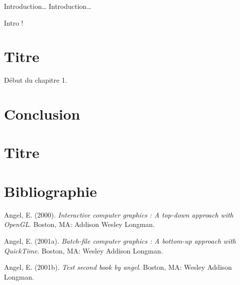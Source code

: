 \documentclass[12pt,a4paper]{reedthesis}
\newenvironment{CSLReferences}%
  {}%
  {\par}
\begin{document}
Introduction\ldots{} Introduction\ldots{}

Intro !

\hypertarget{rmd-basics}{%
\chapter{Titre}\label{rmd-basics}}

Début du chapitre 1.

\hypertarget{conclusion}{%
\chapter*{Conclusion}\label{conclusion}}

\appendix

\hypertarget{titre}{%
\chapter{Titre}\label{titre}}

\backmatter

\hypertarget{bibliographie}{%
\chapter*{Bibliographie}\label{bibliographie}}


\noindent

\setlength{\parindent}{-0.20in}
\setlength{\leftskip}{0.20in}
\setlength{\parskip}{8pt}

\hypertarget{refs}{}
\begin{CSLReferences}{1}{0}
\leavevmode\hypertarget{ref-angel2000}{}%
Angel, E. (2000). \emph{Interactive computer graphics : A top-down approach with OpenGL}. Boston, MA: Addison Wesley Longman.

\leavevmode\hypertarget{ref-angel2001}{}%
Angel, E. (2001a). \emph{Batch-file computer graphics : A bottom-up approach with QuickTime}. Boston, MA: Wesley Addison Longman.

\leavevmode\hypertarget{ref-angel2002a}{}%
Angel, E. (2001b). \emph{Test second book by angel}. Boston, MA: Wesley Addison Longman.

\end{CSLReferences}

\newpage
\thispagestyle{empty}
\selectfont
\end{document}
